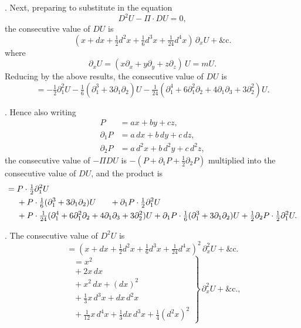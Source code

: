 \documentclass[11pt]{article}
\begin{document}
\medskip

. Next, preparing to substitute in the equation
\[
D^2U - \Pi \cdot DU = 0,
\]
the consecutive value of $DU$ is
\[
(x + dx + \tfrac{1}{2}d^2x + \tfrac{1}{6}d^3x + \tfrac{1}{24}d^4x)\,\partial_x U + \&\text{c.}
\]
where
\[
\partial_x U = (x\partial_x + y\partial_y + z\partial_z)\,U = mU.
\]
Reducing by the above results, the consecutive value of $DU$ is
\[
= -\tfrac{1}{2}\partial_1^2 U - \tfrac{1}{6}(\partial_1^3 + 3\partial_1\partial_2)U - \tfrac{1}{24}(\partial_1^4 + 6\partial_1^2\partial_2 + 4\partial_1\partial_3 + 3\partial_2^2)U.
\]

\medskip

. Hence also writing
\[
\begin{aligned}
P &= ax + by + cz,\\
\partial_1 P &= a\,dx + b\,dy + c\,dz,\\
\partial_2 P &= a\,d^2x + b\,d^2y + c\,d^2z,
\end{aligned}
\]
the consecutive value of $-\Pi DU$ is $-(P + \partial_1 P + \tfrac{1}{2}\partial_2 P)$ multiplied into the consecutive value of $DU$, and the product is
\[
\begin{aligned}
={}& P \cdot \tfrac{1}{2}\partial_1^2 U\\
&{} + P \cdot \tfrac{1}{6}(\partial_1^3 + 3\partial_1\partial_2)U\hphantom{xxx} + \partial_1 P \cdot \tfrac{1}{2}\partial_1^2 U\\
&{} + P \cdot \tfrac{1}{24}(\partial_1^4 + 6\partial_1^2\partial_2 + 4\partial_1\partial_3 + 3\partial_2^2)U + \partial_1 P \cdot \tfrac{1}{6}(\partial_1^3 + 3\partial_1\partial_2)U + \tfrac{1}{2}\partial_2 P \cdot \tfrac{1}{2}\partial_1^2 U.
\end{aligned}
\]

\medskip

. The consecutive value of $D^2U$ is
\[
= (x + dx + \tfrac{1}{2}d^2x + \tfrac{1}{6}d^3x + \tfrac{1}{24}d^4x)^2\,\partial_x^2 U + \&\text{c.}
\]
\[
\left.
\begin{aligned}
&= x^2\\
&{} + 2x\,dx\\
&{} + x^2\,dx + (dx)^2\\
&{} + \tfrac{1}{3}x\,d^3x + dx\,d^2x\\
&{} + \tfrac{1}{12}x\,d^4x + \tfrac{1}{3}dx\,d^3x + \tfrac{1}{4}(d^2x)^2
\end{aligned}
\right\}\,\partial_x^2 U + \&\text{c.},
\]

\medskip
\end{document}
